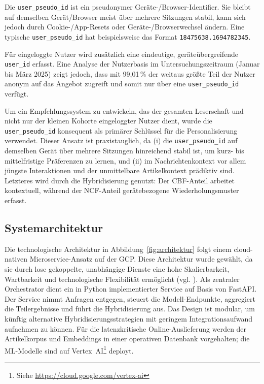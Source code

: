 Die \texttt{user\_pseudo\_id} ist ein pseudonymer Geräte-/Browser-Identifier. 
Sie bleibt auf demselben Gerät/Browser meist über mehrere Sitzungen stabil, kann sich jedoch durch Cookie-/App-Resets 
oder Geräte-/Browserwechsel ändern. Eine typische \texttt{user\_pseudo\_id} hat beispielsweise das Format 
\texttt{18475638.1694782345}.

Für eingeloggte Nutzer wird zusätzlich eine eindeutige, geräteübergreifende 
\texttt{user\_id} erfasst. Eine Analyse der Nutzerbasis im Untersuchungszeitraum (Januar bis März 2025) zeigt jedoch, 
dass mit 99,01\,\% der weitaus größte Teil der Nutzer anonym auf das Angebot zugreift und somit nur über eine 
\texttt{user\_pseudo\_id} verfügt.

Um ein Empfehlungssystem zu entwickeln, das der gesamten Leserschaft und nicht nur der kleinen Kohorte 
eingeloggter Nutzer dient, wurde die \texttt{user\_pseudo\_id} konsequent als primärer Schlüssel für die Personalisierung 
verwendet. Dieser Ansatz ist praxistauglich, da (i) die \texttt{user\_pseudo\_id} auf demselben Gerät über mehrere 
Sitzungen hinreichend stabil ist, um kurz- bis mittelfristige Präferenzen zu lernen, und (ii) im Nachrichtenkontext 
vor allem jüngste Interaktionen und der unmittelbare Artikelkontext prädiktiv sind. Letzteres wird durch die Hybridisierung 
genutzt: Der \ac{CBF}-Anteil arbeitet kontextuell, während der \ac{NCF}-Anteil gerätebezogene Wiederholungsmuster erfasst.

\subsection{Systemarchitektur}
Die technologische Architektur in Abbildung~\ref{fig:architektur} folgt einem cloud-nativen Microservice-Ansatz auf der 
\ac{GCP}. Diese Architektur wurde gewählt, da sie durch lose gekoppelte, unabhängige Dienste eine hohe Skalierbarkeit, 
Wartbarkeit und technologische Flexibilität ermöglicht (vgl. \cite{Newman_Microservices_2015}). Als zentraler 
Orchestrator dient ein in Python implementierter Service auf Basis von FastAPI. Der Service nimmt Anfragen entgegen, 
steuert die Modell-Endpunkte, aggregiert die Teilergebnisse und führt die Hybridisierung aus. Das Design ist modular, 
um künftig alternative Hybridisierungsstrategien mit geringem Integrationsaufwand aufnehmen zu können. 
Für die latenzkritische Online-Auslieferung werden der Artikelkorpus und Embeddings in einer operativen 
Datenbank vorgehalten; die ML-Modelle sind auf Vertex~AI\footnote{Siehe \url{https://cloud.google.com/vertex-ai}} deployt.


